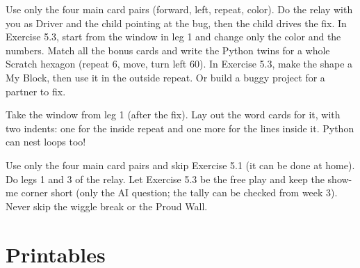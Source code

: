 \begin{differentiation}
\supportpath Use only the four main card pairs (forward, left, repeat, color). Do the relay with you as Driver and the child pointing at the bug, then the child drives the fix. In Exercise 5.3, start from the window in leg 1 and change only the color and the numbers.
\extensionpath Match all the bonus cards and write the Python twins for a whole Scratch hexagon (repeat 6, move, turn left 60). In Exercise 5.3, make the shape a My Block, then use it in the outside repeat. Or build a buggy project for a partner to fix.
\end{differentiation}

\begin{stretchchallenge}
Take the window from leg 1 (after the fix). Lay out the word cards for it, with two indents: one for the inside repeat and one more for the lines inside it. Python can nest loops too!
\end{stretchchallenge}

\begin{teachernote}
Use only the four main card pairs and skip Exercise 5.1 (it can be done at home). Do legs 1 and 3 of the relay. Let Exercise 5.3 be the free play and keep the show-me corner short (only the AI question; the tally can be checked from week 3). Never skip the wiggle break or the Proud Wall.
\end{teachernote}

\section{Printables}
